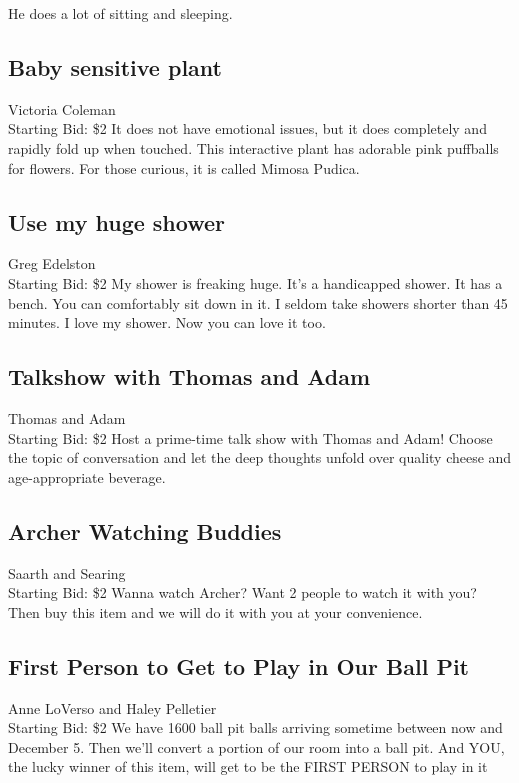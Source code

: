 \documentclass[11pt]{article}
\begin{document}
He does a lot of sitting and sleeping.
\subsection{Baby sensitive plant}
Victoria Coleman
\\
Starting Bid: \$2
\newline
It does not have emotional issues, but it does completely and rapidly fold up when touched. This interactive plant has adorable pink puffballs for flowers. For those curious, it is called Mimosa Pudica.
\subsection{Use my huge shower}
Greg Edelston
\\
Starting Bid: \$2
\newline
My shower is freaking huge. It's a handicapped shower. It has a bench. You can comfortably sit down in it. I seldom take showers shorter than 45 minutes. I love my shower. Now you can love it too.
\subsection{Talkshow with Thomas and Adam}
Thomas and Adam
\\
Starting Bid: \$2
\newline
Host a prime-time talk show with Thomas and Adam! Choose the topic of conversation and let the deep thoughts unfold over quality cheese and age-appropriate beverage.
\subsection{Archer Watching Buddies}
Saarth and Searing
\\
Starting Bid: \$2
\newline
Wanna watch Archer? Want 2 people to watch it with you? Then buy this item and we will do it with you at your convenience.
\subsection{First Person to Get to Play in Our Ball Pit}
Anne LoVerso and Haley Pelletier
\\
Starting Bid: \$2
\newline
We have 1600 ball pit balls arriving sometime between now and December 5.  Then we'll convert a portion of our room into a ball pit.  And YOU, the lucky winner of this item, will get to be the FIRST PERSON to play in it
\end{document}
